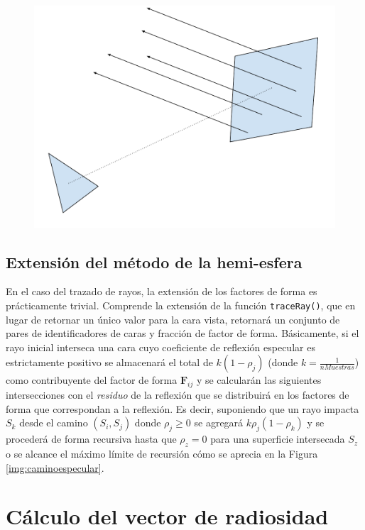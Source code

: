 \begin{figure}[H]
	\centering
	\includegraphics[width=.8\linewidth]{assets/Hibrido}
	\label{img:hibrido}
\end{figure}

\subsection{Extensión del método de la hemi-esfera}

En el caso del trazado de rayos, la extensión de los factores de forma es prácticamente trivial. Comprende la extensión de la función \verb|traceRay()|, que en lugar de retornar un único valor para la cara vista, retornará un conjunto de pares de identificadores de caras y fracción de factor de forma. Básicamente, si el rayo inicial interseca una cara cuyo coeficiente de reflexión especular es estrictamente positivo se almacenará el total de $k(1 - \rho_{j})$ (donde $k = \frac{1}{nMuestras}$) como contribuyente del factor de forma $\mathbf{F}_{ij}$ y se calcularán las siguientes intersecciones con el \textit{residuo} de la reflexión que se distribuirá en los factores de forma que correspondan a la reflexión. Es decir, suponiendo que un rayo impacta $S_{k}$ desde el camino $(S_{i}, S_{j})$ donde $\rho_{j} \ge 0$ se agregará $k\rho_{j}(1 - \rho_{k})$ y se procederá de forma recursiva hasta que $\rho_{z} = 0$ para una superficie intersecada $S_{z}$ o se alcance el máximo límite de recursión cómo se aprecia en la Figura \ref{img:caminoespecular}.

\section{Cálculo del vector de radiosidad}

